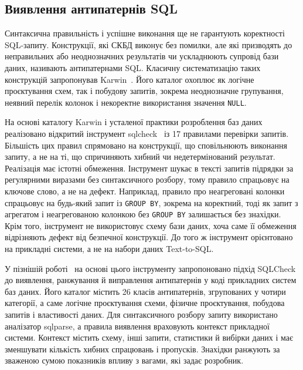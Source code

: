\documentclass[a4paper,14pt,oneside]{extreport}
\begin{document}
\subsection{Виявлення антипатернів SQL}
\label{subsec:antipatterns}

Синтаксична правильність і успішне виконання ще не гарантують коректності SQL-запиту. Конструкції, які СКБД виконує без помилки, але які призводять до неправильних або неоднозначних результатів чи ускладнюють супровід бази даних, називають антипатернами SQL. Класичну систематизацію таких конструкцій запропонував Karwin~\cite{karwin2010sqlantipatterns}. Його каталог охоплює як логічне проєктування схем, так і побудову запитів, зокрема неоднозначне групування, неявний перелік колонок і некоректне використання значення \texttt{NULL}.

На основі каталогу Karwin і усталеної практики розроблення баз даних реалізовано відкритий інструмент sqlcheck~\cite{sqlcheckRepo} із 17 правилами перевірки запитів. Більшість цих правил спрямовано на конструкції, що сповільнюють виконання запиту, а не на ті, що спричиняють хибний чи недетермінований результат. Реалізація має істотні обмеження. Інструмент шукає в тексті запитів підрядки за регулярними виразами без синтаксичного розбору, тому правило спрацьовує на ключове слово, а не на дефект. Наприклад, правило про неагреговані колонки спрацьовує на будь-який запит із \texttt{GROUP~BY}, зокрема на коректний, тоді як запит з агрегатом і неагрегованою колонкою без \texttt{GROUP~BY} залишається без знахідки. Крім того, інструмент не використовує схему бази даних, хоча саме її обмеження відрізняють дефект від безпечної конструкції. До того ж інструмент орієнтовано на прикладні системи, а не на набори даних Text-to-SQL.

У пізнішій роботі~\cite{dintyala2020sqlcheck} на основі цього інструменту запропоновано підхід SQLCheck до виявлення, ранжування й виправлення антипатернів у коді прикладних систем баз даних. Його каталог містить 26 класів антипатернів, згрупованих у чотири категорії, а саме логічне проєктування схеми, фізичне проєктування, побудова запитів і властивості даних. Для синтаксичного розбору запиту використано аналізатор sqlparse, а правила виявлення враховують контекст прикладної системи. Контекст містить схему, інші запити, статистики й вибірки даних і має зменшувати кількість хибних спрацювань і пропусків. Знахідки ранжують за зваженою сумою показників впливу з вагами, які задає розробник.
\end{document}

